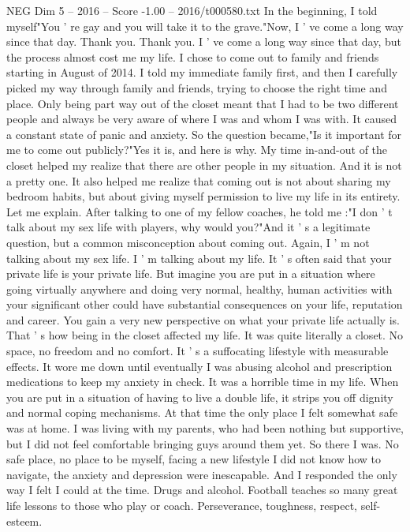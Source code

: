 \begin{textsample}{NEG Dim 5 – 2016 – Score -1.00 – 2016/t000580.txt}
In the beginning, I told myself"You ' re gay and you will take it to the grave."Now, I ' ve come a long way since that day.
Thank you.
Thank you.
I ' ve come a long way since that day, but the process almost cost me my life.
I chose to come out to family and friends starting in August of 2014.
I told my immediate family first, and then I carefully picked my way through family and friends, trying to choose the right time and place.
Only being part way out of the closet meant that I had to be two different people and always be very aware of where I was and whom I was with.
It caused a constant state of panic and anxiety.
So the question became,"Is it important for me to come out publicly?"Yes it is, and here is why.
My time in-and-out of the closet helped my realize that there are other people in my situation.
And it is not a pretty one.
It also helped me realize that coming out is not about sharing my bedroom habits, but about giving myself permission to live my life in its entirety.
Let me explain.
After talking to one of my fellow coaches, he told me :"I don ' t talk about my sex life with players, why would you?"And it ' s a legitimate question, but a common misconception about coming out.
Again, I ' m not talking about my sex life.
I ' m talking about my life.
It ' s often said that your private life is your private life.
But imagine you are put in a situation where going virtually anywhere and doing very normal, healthy, human activities with your significant other could have substantial consequences on your life, reputation and career.
You gain a very new perspective on what your private life actually is.
That ' s how being in the closet affected my life.
It was quite literally a closet.
No space, no freedom and no comfort.
It ' s a suffocating lifestyle with measurable effects.
It wore me down until eventually I was abusing alcohol and prescription medications to keep my anxiety in check.
It was a horrible time in my life.
When you are put in a situation of having to live a double life, it strips you off dignity and normal coping mechanisms.
At that time the only place I felt somewhat safe was at home.
I was living with my parents, who had been nothing but supportive, but I did not feel comfortable bringing guys around them yet.
So there I was.
No safe place, no place to be myself, facing a new lifestyle I did not know how to navigate, the anxiety and depression were inescapable.
And I responded the only way I felt I could at the time.
Drugs and alcohol.
Football teaches so many great life lessons to those who play or coach.
Perseverance, toughness, respect, self-esteem.

\end{textsample}
